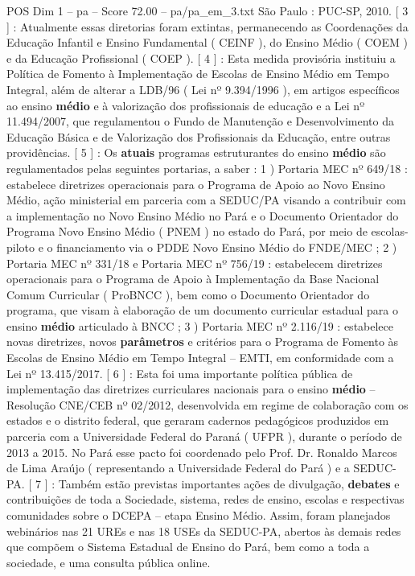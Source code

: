 \begin{textsample}{POS Dim 1 – pa – Score 72.00 – pa/pa\_em\_3.txt}
São Paulo : PUC-SP, 2010. [ 3 ] : Atualmente essas diretorias foram extintas, permanecendo as Coordenações da Educação Infantil e Ensino Fundamental ( CEINF ), do Ensino Médio ( COEM ) e da Educação Profissional ( COEP ). [ 4 ] : Esta medida provisória instituiu a Política de Fomento à Implementação de Escolas de Ensino Médio em Tempo Integral, além de alterar a LDB/96 ( Lei nº 9.394/1996 ), em artigos específicos ao ensino \textbf{médio} e à valorização dos profissionais de educação e a Lei nº 11.494/2007, que regulamentou o Fundo de Manutenção e Desenvolvimento da Educação Básica e de Valorização dos Profissionais da Educação, entre outras providências. [ 5 ] : Os \textbf{atuais} programas estruturantes do ensino \textbf{médio} são regulamentados pelas seguintes portarias, a saber : 1 ) Portaria MEC nº 649/18 : estabelece diretrizes operacionais para o Programa de Apoio ao Novo Ensino Médio, ação ministerial em parceria com a SEDUC/PA visando a contribuir com a implementação no Novo Ensino Médio no Pará e o Documento Orientador do Programa Novo Ensino Médio ( PNEM ) no estado do Pará, por meio de escolas-piloto e o financiamento via o PDDE Novo Ensino Médio do FNDE/MEC ; 2 ) Portaria MEC nº 331/18 e Portaria MEC nº 756/19 : estabelecem diretrizes operacionais para o Programa de Apoio à Implementação da Base Nacional Comum Curricular ( ProBNCC ), bem como o Documento Orientador do programa, que visam à elaboração de um documento curricular estadual para o ensino \textbf{médio} articulado à BNCC ; 3 ) Portaria MEC nº 2.116/19 : estabelece novas diretrizes, novos \textbf{parâmetros} e critérios para o Programa de Fomento às Escolas de Ensino Médio em Tempo Integral – EMTI, em conformidade com a Lei nº 13.415/2017. [ 6 ] : Esta foi uma importante política pública de implementação das diretrizes curriculares nacionais para o ensino \textbf{médio} – Resolução CNE/CEB nº 02/2012, desenvolvida em regime de colaboração com os estados e o distrito federal, que geraram cadernos pedagógicos produzidos em parceria com a Universidade Federal do Paraná ( UFPR ), durante o período de 2013 a 2015.
No Pará esse pacto foi coordenado pelo Prof.
Dr.
Ronaldo Marcos de Lima Araújo ( representando a Universidade Federal do Pará ) e a SEDUC-PA. [ 7 ] : Também estão previstas importantes ações de divulgação, \textbf{debates} e contribuições de toda a Sociedade, sistema, redes de ensino, escolas e respectivas comunidades sobre o DCEPA – etapa Ensino Médio.
Assim, foram planejados webinários nas 21 UREs e nas 18 USEs da SEDUC-PA, abertos às demais redes que compõem o Sistema Estadual de Ensino do Pará, bem como a toda a sociedade, e uma consulta pública online.

\end{textsample}

